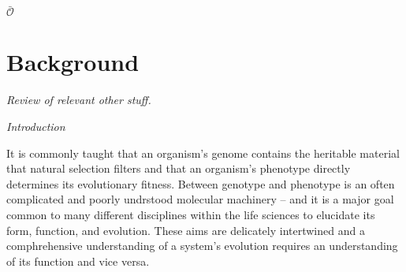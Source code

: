\documentclass[11 pt]{article}
\newcommand{\plr}[1]{{\color{blue}\it #1}}
\newcommand{\jss}[1]{{\color{olive}\it #1}}
\newcommand{\unobservable}{\bar{\mathcal{O}}}
\begin{document}
$\unobservable$

% 
% 
% 
% 
% 
% 
%
% 
%
%
%
% 
%
%
% 

% 

\section{Background}

\plr{Review of relevant other stuff.}

\jss{Introduction}

It is commonly taught that an organism's genome contains the heritable material 
that natural selection filters and that an organism's phenotype directly determines its
evolutionary fitness. Between genotype and phenotype is an often complicated and poorly
undrstood molecular machinery -- and it is a major goal common to many different disciplines
within the life sciences to elucidate its form, function, and evolution. These aims are
delicately intertwined and a comphrehensive understanding of a system's evolution requires
an understanding of its function and vice versa.
\end{document}
